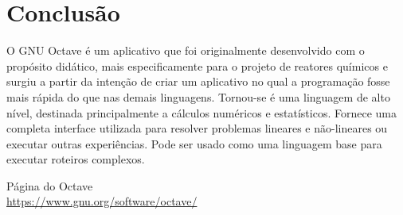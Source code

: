 \documentclass[a4paper,11pt]{article}
\begin{document}
\section{Conclusão}
O GNU Octave é um aplicativo que foi originalmente desenvolvido com o propósito didático, mais especificamente para o projeto de reatores químicos e surgiu a partir da intenção de criar um aplicativo no qual a programação fosse mais rápida do que nas demais linguagens. Tornou-se é uma linguagem de alto nível, destinada principalmente a cálculos numéricos e estatísticos. Fornece uma completa interface utilizada para resolver problemas lineares e não-lineares ou executar outras experiências. Pode ser usado como uma linguagem base para executar roteiros complexos.



\begin{thebibliography}{4}
	Página do Octave \\
	\url{https://www.gnu.org/software/octave/}
	
	
\end{thebibliography}
\end{document}
